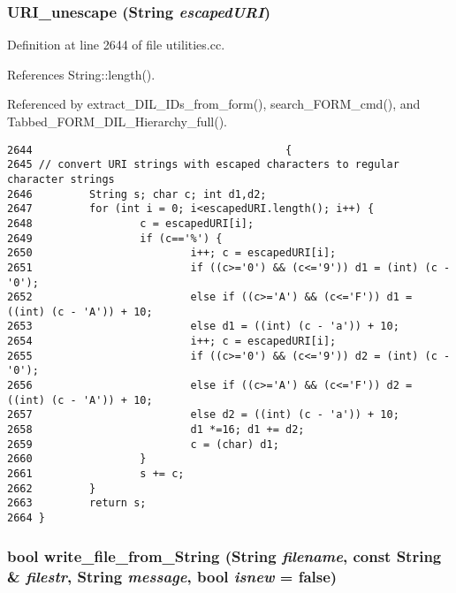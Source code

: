 \subsubsection{ URI\_\-unescape ({\bf String} {\em escaped\-URI})}\label{dil2al_8hh_a278}




Definition at line 2644 of file utilities.cc.

References String::length().

Referenced by extract\_\-DIL\_\-IDs\_\-from\_\-form(), search\_\-FORM\_\-cmd(), and Tabbed\_\-FORM\_\-DIL\_\-Hierarchy\_\-full().



\footnotesize\begin{verbatim}2644                                        {
2645 // convert URI strings with escaped characters to regular character strings
2646         String s; char c; int d1,d2;
2647         for (int i = 0; i<escapedURI.length(); i++) {
2648                 c = escapedURI[i];
2649                 if (c=='%') {
2650                         i++; c = escapedURI[i];
2651                         if ((c>='0') && (c<='9')) d1 = (int) (c - '0');
2652                         else if ((c>='A') && (c<='F')) d1 = ((int) (c - 'A')) + 10;
2653                         else d1 = ((int) (c - 'a')) + 10;
2654                         i++; c = escapedURI[i];
2655                         if ((c>='0') && (c<='9')) d2 = (int) (c - '0');
2656                         else if ((c>='A') && (c<='F')) d2 = ((int) (c - 'A')) + 10;
2657                         else d2 = ((int) (c - 'a')) + 10;
2658                         d1 *=16; d1 += d2;
2659                         c = (char) d1;
2660                 }
2661                 s += c;
2662         }
2663         return s;
2664 }
\end{verbatim}\normalsize 
{}
\subsubsection{\setlength{\rightskip}{0pt plus 5cm}bool write\_\-file\_\-from\_\-String ({\bf String} {\em filename}, const {\bf String} \& {\em filestr}, {\bf String} {\em message}, bool {\em isnew} = {\bf false})}\label{dil2al_8hh_a238}





